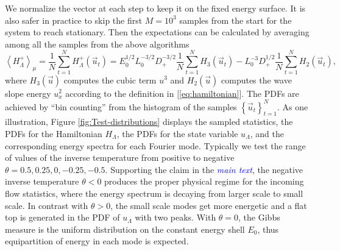 \documentclass[9pt,twoside,lineno]{pnas-new}
\theoremstyle{plain}
\theoremstyle{plain}
\begin{document}
We normalize the vector at each step to keep it on the fixed energy
surface. It is also safer in practice to skip the first $M=10^{3}$
samples from the start for the system to reach stationary. Then the
expectations can be calculated by averaging among all the samples
from the above algorithms
\[
\left\langle H_{\Lambda}^{+}\right\rangle _{\mu}=\frac{1}{N}\sum_{t=1}^{N}H_{\Lambda}^{+}\left(\vec{u}_{t}\right)=E_{0}^{1/2}L_{0}^{-3/2}D_{+}^{-3/2}\frac{1}{N}\sum_{t=1}^{N}H_{3}\left(\vec{u}_{t}\right)-L_{0}^{-3}D_{+}^{1/2}\frac{1}{N}\sum_{t=1}^{N}H_{2}\left(\vec{u}_{t}\right),
\]
where $H_{3}\left(\vec{u}\right)$ computes the cubic term $u^{3}$
and $H_{2}\left(\vec{u}\right)$ computes the wave slope energy $u_{x}^{2}$
according to the definition in [\ref{eq:hamiltonian}]. The PDFs are
achieved by ``bin counting'' from the histogram of the samples $\left\{ \vec{u}_{t}\right\} _{t=1}^{N}$.
As one illustration, Figure \ref{fig:Test-distributions} displays the
sampled statistics, the PDFs for the Hamiltonian $H_{\Lambda}$, the
PDFs for the state variable $u_{\Lambda}$, and the corresponding
energy spectra for each Fourier mode. Typically we test the range
of values of the inverse temperature from positive to negative $\theta=0.5,0.25,0,-0.25,-0.5$.
Supporting the claim in the \textcolor{blue}{\emph{main text}}, the negative inverse
temperature $\theta<0$ produces the proper physical regime for the
incoming flow statistics, where the energy spectrum is decaying from
larger scale to small scale. In contrast with $\theta>0$, the small
scale modes get more energetic and a flat top is generated in the
PDF of $u_{\Lambda}$ with two peaks. With $\theta=0$, the Gibbs
measure is the uniform distribution on the constant energy shell $E_{0}$,
thus equipartition of energy in each mode is expected.
\end{document}
